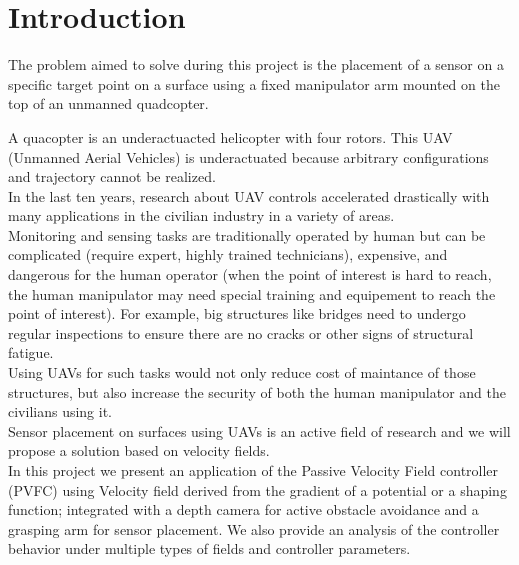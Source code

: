 \section{Introduction}
The problem aimed to solve during this project is the placement of a sensor on a specific target point on a surface using a fixed manipulator arm mounted on the top of an unmanned quadcopter.

A quacopter is an underactuacted helicopter with four rotors. This UAV (Unmanned Aerial Vehicles) is underactuated because arbitrary configurations and trajectory cannot be realized.\\
In the last ten years, research about UAV controls accelerated drastically with many applications in the civilian industry in a variety of areas.\\
Monitoring and sensing tasks are traditionally operated by human but can be complicated (require expert, highly trained technicians), expensive,  and dangerous for the human operator (when the point of interest is hard to reach, the human manipulator may need special training and equipement to reach the point of interest). For example, big structures like bridges need to undergo regular inspections to ensure there are no cracks or other signs of structural fatigue.\\
Using UAVs for such tasks would not only reduce cost of maintance of those structures, but also increase the security of both the human manipulator and the civilians using it. \\
Sensor placement on surfaces using UAVs  is an active field of research and we will propose a solution based on velocity fields.\\

In this project we present an application of the Passive Velocity Field controller (PVFC) using Velocity field derived from the gradient of a potential or a shaping function; integrated with a depth camera for active obstacle avoidance and a grasping arm for sensor placement. We also provide an analysis of the controller behavior under multiple types of fields and controller parameters.\\

